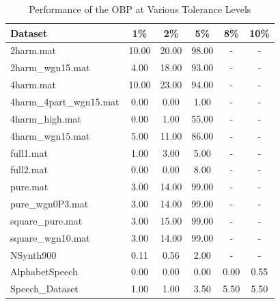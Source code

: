 \documentclass{ieeeaccess}
\begin{document}
\begin{table}[h!]
\centering
\begin{tabular}{lccccc}
\hline
\textbf{Dataset} & \textbf{1\%} & \textbf{2\%} & \textbf{5\%} & \textbf{8\%} & \textbf{10\%} \\ \hline
2harm.mat & 10.00 & 20.00 & 98.00 & - & - \\ 
2harm\_wgn15.mat & 4.00 & 18.00 & 93.00 & - & - \\ 
4harm.mat & 10.00 & 23.00 & 94.00 & - & - \\ 
4harm\_4part\_wgn15.mat & 0.00 & 0.00 & 1.00 & - & - \\ 
4harm\_high.mat & 0.00 & 1.00 & 55.00 & - & - \\ 
4harm\_wgn15.mat & 5.00 & 11.00 & 86.00 & - & - \\ 
full1.mat & 1.00 & 3.00 & 5.00 & - & - \\ 
full2.mat & 0.00 & 0.00 & 8.00 & - & - \\ 
pure.mat & 3.00 & 14.00 & 99.00 & - & - \\ 
pure\_wgn0P3.mat & 3.00 & 14.00 & 99.00 & - & - \\ 
square\_pure.mat & 3.00 & 15.00 & 99.00 & - & - \\ 
square\_wgn10.mat & 3.00 & 14.00 & 99.00 & - & - \\ 
NSynth900 & 0.11 & 0.56 & 2.00 & - & - \\ 
AlphabetSpeech & 0.00 & 0.00 & 0.00 & 0.00 & 0.55 \\ 
Speech\_Dataset & 1.00 & 1.00 & 3.50 & 5.50 & 5.50 \\ \hline
\end{tabular}
\caption{Performance of the OBP at Various Tolerance Levels}
\label{tab:obp_performance}
\end{table}
\end{document}
